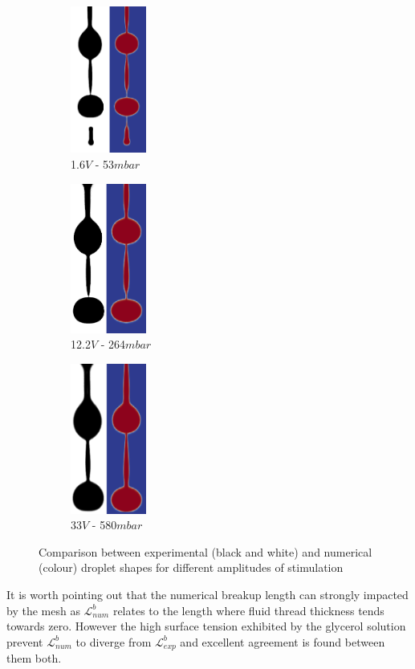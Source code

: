 \documentclass[twocolumn,10pt]{asme2ej}
\begin{document}
\begin{figure}[h]
    \centering
    \begin{subfigure}{2.7cm}
        \centering
        \includegraphics[width=2.5cm]{Glycerol/num_exp_053mbar_1.png}
        \caption{1.6$V$ - 53$mbar$}
    \end{subfigure}
    \hfill
    \begin{subfigure}{2.7cm}
        \centering
        \includegraphics[width=2.5cm]{Glycerol/num_exp_264mbar.png}
        \caption{12.2$V$ - 264$mbar$}
    \end{subfigure}
    \hfill
    \begin{subfigure}{2.7cm}
        \centering
        \includegraphics[width=2.5cm]{Glycerol/num_exp_580mbar_1.png}
        \caption{33$V$ - 580$mbar$}
    \end{subfigure}
       \caption{Comparison between experimental (black and white) and numerical (colour) droplet shapes for different amplitudes of stimulation}
       \label{fig:glycerolDrop}
\end{figure}
It is worth pointing out that the numerical breakup length can strongly impacted by the mesh as $\mathcal{L}_{num}^b$ relates to the length where fluid thread thickness tends towards zero. However the high surface tension exhibited by the glycerol solution prevent $\mathcal{L}_{num}^b$ to diverge from $\mathcal{L}_{exp}^b$ and excellent agreement is found between them both. 
\end{document}
